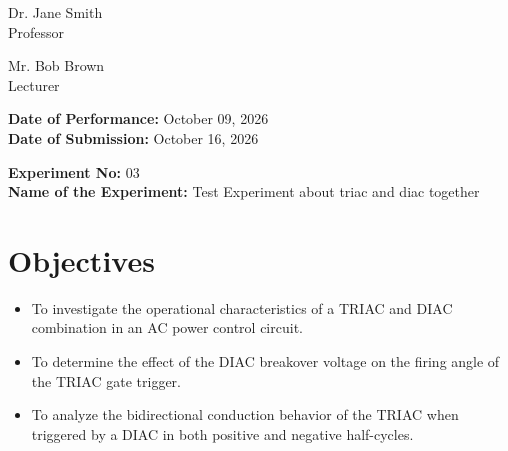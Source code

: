 \documentclass[12pt,a4paper]{article}
\begin{document}
\begin{titlepage}
\begin{minipage}[t]{0.5\textwidth}
\begin{flushright}
            Dr. Jane Smith \\
            Professor \\
            \vspace{0.3cm}
            
            Mr. Bob Brown \\
            Lecturer \\
            
            
        \end{flushright}
    \end{minipage}

    \vfill
    \textbf{Date of Performance:} October 09, 2026 \\
    \textbf{Date of Submission:} October 16, 2026
    
\end{titlepage}

\setcounter{page}{1}
\rmfamily %
\normalsize

\begin{center}
    \textbf{Experiment No:} 03 \\
    \vspace{0.2cm}
    \textbf{Name of the Experiment:} Test Experiment about triac and diac together
\end{center}
\vspace{0.5cm}


\section{Objectives}
\begin{itemize}

    \item To investigate the operational characteristics of a TRIAC and DIAC combination in an AC power control circuit.

    \item To determine the effect of the DIAC breakover voltage on the firing angle of the TRIAC gate trigger.

    \item To analyze the bidirectional conduction behavior of the TRIAC when triggered by a DIAC in both positive and negative half-cycles.

\end{itemize}
\end{document}
